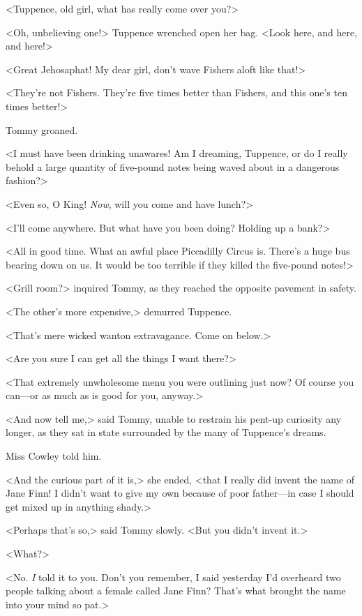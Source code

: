 <Tuppence, old girl, what has really come over you?>

<Oh, unbelieving one!> Tuppence wrenched open her bag. <Look here, and here, and here!>

<Great Jehosaphat! My dear girl, don't wave Fishers aloft like that!>

<They're not Fishers. They're five times better than Fishers, and this one's ten times better!>

Tommy groaned.

<I must have been drinking unawares! Am I dreaming, Tuppence, or do I really behold a large quantity of five-pound notes being waved about in a dangerous fashion?>

<Even so, O King! \emph{Now}, will you come and have lunch?>

<I'll come anywhere. But what have you been doing? Holding up a bank?>

<All in good time. What an awful place Piccadilly Circus is. There's a huge bus bearing down on us. It would be too terrible if they killed the five-pound notes!>

<Grill room?> inquired Tommy, as they reached the opposite pavement in safety.

<The other's more expensive,> demurred Tuppence.

<That's mere wicked wanton extravagance. Come on below.>

<Are you sure I can get all the things I want there?>

<That extremely unwholesome menu you were outlining just now? Of course you can—or as much as is good for you, anyway.>

<And now tell me,> said Tommy, unable to restrain his pent-up curiosity any longer, as they sat in state surrounded by the many  of Tuppence's dreams.

Miss Cowley told him.

<And the curious part of it is,> she ended, <that I really did invent the name of Jane Finn! I didn't want to give my own because of poor father—in case I should get mixed up in anything shady.>

<Perhaps that's so,> said Tommy slowly. <But you didn't invent it.>

<What?>

<No. \emph{I} told it to you. Don't you remember, I said yesterday I'd overheard two people talking about a female called Jane Finn? That's what brought the name into your mind so pat.>

